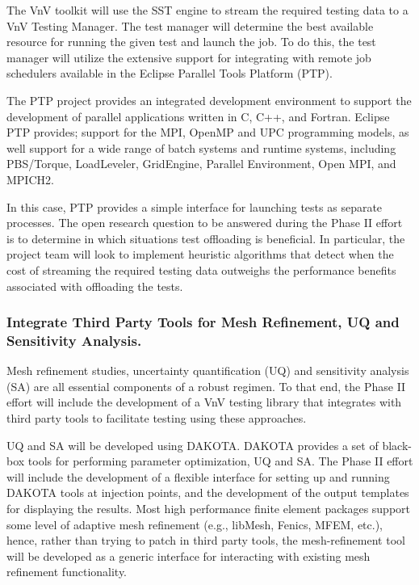 The VnV toolkit will use the SST engine to stream the required testing data to a VnV Testing Manager. The test manager will determine the best available resource for running the given test and launch the job. To do this, the test manager will utilize the extensive support for integrating with remote job schedulers available in the Eclipse Parallel Tools Platform (PTP). 

The PTP project provides an integrated development environment to support the development of parallel applications written in C, C++, and Fortran. Eclipse PTP provides; support for the MPI, OpenMP and UPC programming models, as well support for a wide range of batch systems and runtime systems, including PBS/Torque, LoadLeveler, GridEngine, Parallel Environment, Open MPI, and MPICH2.

In this case, PTP provides a simple interface for launching tests as separate processes. The open research question to be answered during the Phase II effort is to determine in which situations test offloading is beneficial. In particular, the project team will look to implement heuristic algorithms that detect when the cost of streaming the required testing data outweighs the performance benefits associated with offloading the tests. 

\subsubsection{Integrate Third Party Tools for Mesh Refinement, UQ and Sensitivity Analysis.}

Mesh refinement studies, uncertainty quantification (UQ) and sensitivity analysis (SA) are all essential components of a robust \VV regimen. To that end, the Phase II effort will include the development of a VnV testing library that integrates with third party tools to facilitate testing using these approaches.  

UQ and SA will be developed using DAKOTA. DAKOTA provides a set of black-box tools for performing parameter optimization, UQ 
and SA. The Phase II effort will include the development of a flexible interface for setting up and running DAKOTA tools at injection points, and the development of the output templates for displaying the results. Most high performance finite element packages support some level of adaptive mesh refinement (e.g., libMesh, Fenics, MFEM, etc.), hence, rather than trying to patch in third party tools, the mesh-refinement tool will be developed as a generic interface for interacting with existing mesh refinement functionality. 

